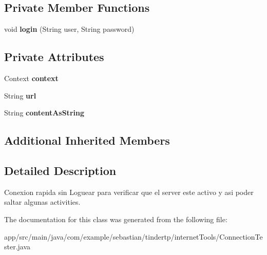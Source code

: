 \subsection*{Private Member Functions}
\begin{DoxyCompactItemize}
\item 
void {\bfseries login} (String user, String password)\hypertarget{classcom_1_1example_1_1sebastian_1_1tindertp_1_1internetTools_1_1ConnectionTester_a73b4550470459bb4c8f36053a53b47a1}{}\label{classcom_1_1example_1_1sebastian_1_1tindertp_1_1internetTools_1_1ConnectionTester_a73b4550470459bb4c8f36053a53b47a1}

\end{DoxyCompactItemize}
\subsection*{Private Attributes}
\begin{DoxyCompactItemize}
\item 
Context {\bfseries context}\hypertarget{classcom_1_1example_1_1sebastian_1_1tindertp_1_1internetTools_1_1ConnectionTester_a71cbfa460d3adc7ba46006c2df263fba}{}\label{classcom_1_1example_1_1sebastian_1_1tindertp_1_1internetTools_1_1ConnectionTester_a71cbfa460d3adc7ba46006c2df263fba}

\item 
String {\bfseries url}\hypertarget{classcom_1_1example_1_1sebastian_1_1tindertp_1_1internetTools_1_1ConnectionTester_ae5f4a4f11309497029b777f27a993844}{}\label{classcom_1_1example_1_1sebastian_1_1tindertp_1_1internetTools_1_1ConnectionTester_ae5f4a4f11309497029b777f27a993844}

\item 
String {\bfseries content\+As\+String}\hypertarget{classcom_1_1example_1_1sebastian_1_1tindertp_1_1internetTools_1_1ConnectionTester_a518fd90bd8426586e43add77687b8cda}{}\label{classcom_1_1example_1_1sebastian_1_1tindertp_1_1internetTools_1_1ConnectionTester_a518fd90bd8426586e43add77687b8cda}

\end{DoxyCompactItemize}
\subsection*{Additional Inherited Members}


\subsection{Detailed Description}
Conexion rapida sin Loguear para verificar que el server este activo y asi poder saltar algunas activities. 

The documentation for this class was generated from the following file\+:\begin{DoxyCompactItemize}
\item 
app/src/main/java/com/example/sebastian/tindertp/internet\+Tools/Connection\+Tester.\+java\end{DoxyCompactItemize}
